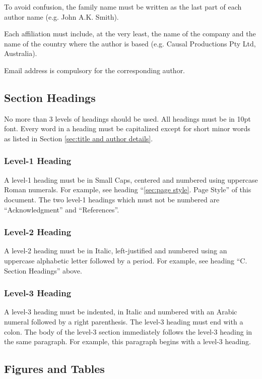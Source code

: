 To avoid confusion, the family name must be written as the
last part of each author name (e.g. John A.K. Smith).

Each affiliation must include, at the very least, the name of
the company and the name of the country where the author is
based (e.g. Causal Productions Pty Ltd, Australia).  

Email address is compulsory for the corresponding author.


\subsection{Section Headings}

No more than 3 levels of headings should be used.  All headings must
be in 10pt font.  Every word in a heading must be capitalized except
for short minor words as listed in Section \ref{sec:title and author
details}.

\subsubsection{Level-1 Heading}

A level-1 heading must be in Small Caps, centered and numbered using
uppercase Roman numerals.  For example, see heading ``\ref{sec:page
style}. Page Style'' of this document.  The two level-1 headings which
must not be numbered are ``Acknowledgment'' and ``References''.

\subsubsection{Level-2 Heading}

A level-2 heading must be in Italic, left-justified and numbered using
an uppercase alphabetic letter followed by a period.  For example, see
heading ``C. Section Headings'' above.

\subsubsection{Level-3 Heading}

A level-3 heading must be indented, in Italic and numbered with an
Arabic numeral followed by a right parenthesis. The level-3 heading
must end with a colon.  The body of the level-3 section immediately
follows the level-3 heading in the same paragraph.  For example, this
paragraph begins with a level-3 heading.

\subsection{Figures and Tables}

